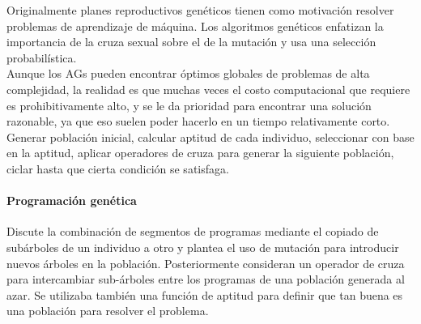 			Originalmente planes reproductivos genéticos tienen como motivación resolver problemas de aprendizaje de máquina. Los algoritmos genéticos enfatizan la importancia de la cruza sexual sobre el de la mutación y usa una selección probabilística.\\
			
			Aunque los AGs pueden encontrar óptimos globales de problemas de alta complejidad, la realidad es que muchas veces el costo computacional que requiere es prohibitivamente alto, y se le da prioridad para encontrar una solución razonable, ya que eso suelen poder hacerlo en un tiempo relativamente corto.\\

			Generar población inicial, calcular aptitud de cada individuo, seleccionar con base en la aptitud, aplicar operadores de cruza para generar la siguiente población, ciclar hasta que cierta condición se satisfaga.\\

			\paragraph{Programación genética}
			Discute la combinación de segmentos de programas mediante el copiado de subárboles de un individuo a otro y plantea el uso de mutación para introducir nuevos árboles en la población. Posteriormente consideran un operador de cruza para intercambiar sub-árboles entre los programas de una población generada al azar. Se utilizaba también una función de aptitud para definir que tan buena es una población para resolver el problema.\\
